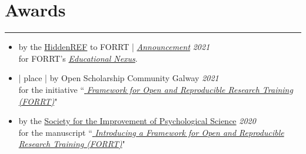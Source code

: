 \documentclass[letterpaper]{article}
\begin{document}




\section*{\color{Brown} Awards}
\vspace{-0.5em}
\hrule
\vspace{1em}
\begin{itemize}

\item[]{ by the \href{https://hidden-ref.org/about/}{\color{BlueViolet}HiddenREF} to FORRT  | \href{https://youtu.be/btjRNG0NANg?t=1070}{\color{BlueViolet} \it Announcement} \hfill{\em 2021} \\ for FORRT's {\href{https://forrt.org/nexus}{\color{BlueViolet} \it Educational Nexus}}.}


\item[]{ |  place | by Open Scholarship Community Galway  \hfill{\em 2021} \\ for the initiative ``{\href{http://forrt.org/}{\color{BlueViolet} \it Framework for Open and Reproducible Research Training (FORRT)}}" \hfill{\em{}}
}

\item[]{ by the \href{http://improvingpsych.org/mission/awards/}{\color{BlueViolet}Society for the Improvement of Psychological Science} \hfill{\em 2020} \\ for the manuscript ``{\href{https://osf.io/bnh7p}{\color{BlueViolet} \it Introducing a Framework for Open and Reproducible Research Training (FORRT)}}"}

\end{itemize}



\end{document}
